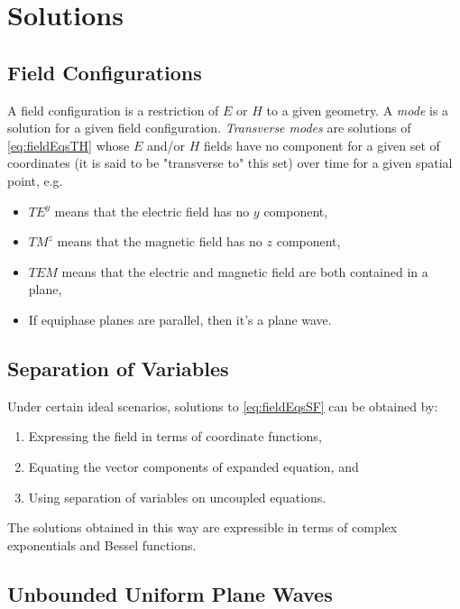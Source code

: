 \documentclass{article}
\numberwithin{equation}{section}
\begin{document}
        \section{Solutions}
        \subsection{Field Configurations}
            A field configuration is a restriction of $E$ or $H$ to a given geometry. A
            \emph{mode} is a solution for a given field configuration. \emph{Transverse
            modes} are solutions of \eqref{eq:fieldEqsTH} whose $E$ and/or $H$ fields
            have no component for a given set of coordinates (it is said to be
            "transverse to" this set) over time for a given spatial point, e.g.
            \begin{itemize}
                \item $TE^y$ means that the electric field has no $y$ component,
                \item $TM^z$ means that the magnetic field has no $z$ component,
                \item $TEM$ means that the electric and magnetic field are both
                    contained in a plane,
                \item If equiphase planes are parallel, then it's a plane wave.
            \end{itemize}
        \subsection{Separation of Variables}
            Under certain ideal scenarios, solutions to \eqref{eq:fieldEqsSF} can be
            obtained by:
            \begin{enumerate}
                \item Expressing the field in terms of coordinate functions,
                \item Equating the vector components of expanded equation, and
                \item Using separation of variables on uncoupled equations.
            \end{enumerate}
            The solutions obtained in this way are expressible in terms of complex
            exponentials and Bessel functions.
        \subsection{Unbounded Uniform Plane Waves}
\end{document}
